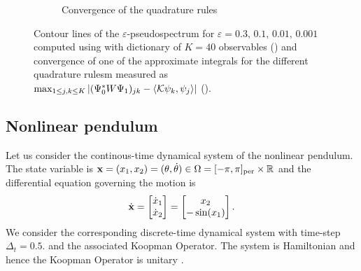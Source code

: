 \begin{figure}[h]
{\begin{subfigure}{0.45\textwidth}
        \caption{Convergence of the quadrature rules}
        \label{gauss_convergence}
    \end{subfigure}\hspace*{\fill}
    }
    \caption{Contour lines of the $\varepsilon$-pseudospectrum for $\varepsilon = 0.3,\,0.1,\,0.01,\,0.001$ computed using  with dictionary of $K=40$ observables () and convergence of one of the approximate integrals for the different quadrature rulesm measured as $\max_{1\leq j,k \leq K} \abs{(\Psi_0^* W \Psi_1)_{jk} - \langle\mathcal{K}\psi_k, \psi_j\rangle}$ ().}
    \label{gauss_pseudospectrum_convergence}
\end{figure}

\subsection{Nonlinear pendulum}
Let us consider the continous-time dynamical system of the nonlinear pendulum. The state variable is $\vb{x} = (x_1, x_2) = (\theta, \dot{\theta}) \in \Omega = [-\pi, \pi]_{\text{per}} \times \mathbb{R}$ and the differential equation governing the motion is
\begin{equation}
    \label{pendulum_equation}
    \dot{\vb{x}} = 
    \begin{bmatrix}
    \dot{x}_1 \\
    \dot{x}_2
    \end{bmatrix} = 
    \begin{bmatrix}
    x_2 \\
    -\sin(x_1)
    \end{bmatrix}.
\end{equation}
We consider the corresponding discrete-time dynamical system with time-step $\Delta_t = 0.5.$ and the associated Koopman Operator. The system is Hamiltonian and hence the Koopman Operator is unitary \cite{koopman_hamiltonian_1931}.

